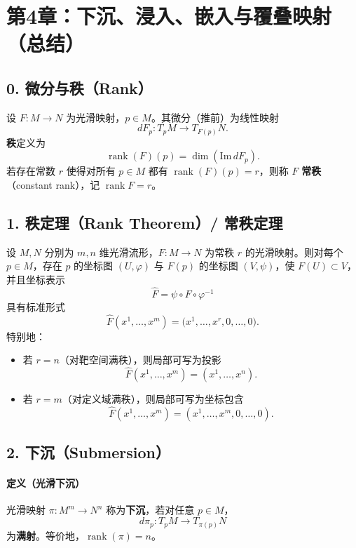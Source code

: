 \documentclass[12pt]{article}
\newcommand{\rank}{\operatorname{rank}}
\begin{document}
\section*{第4章：下沉、浸入、嵌入与覆叠映射（总结）}

\subsection*{0. 微分与秩（Rank）}
设 $F:M\to N$ 为光滑映射，$p\in M$。其微分（推前）为线性映射
\[
dF_p:T_pM\to T_{F(p)}N.
\]
\textbf{秩}定义为
\[
\rank(F)(p)=\dim(\mathrm{Im}\,dF_p).
\]
若存在常数 $r$ 使得对所有 $p\in M$ 都有 $\rank(F)(p)=r$，则称 $F$ \textbf{常秩}（constant rank），记 $\rank F=r$。

\subsection*{1. 秩定理（Rank Theorem）/ 常秩定理}
设 $M,N$ 分别为 $m,n$ 维光滑流形，$F:M\to N$ 为常秩 $r$ 的光滑映射。则对每个 $p\in M$，存在
$p$ 的坐标图 $(U,\varphi)$ 与 $F(p)$ 的坐标图 $(V,\psi)$，使 $F(U)\subset V$，并且坐标表示
\[
\widehat F=\psi\circ F\circ \varphi^{-1}
\]
具有标准形式
\[
\widehat F(x^1,\dots,x^m)=\bigl(x^1,\dots,x^r,0,\dots,0\bigr).
\]
特别地：
\begin{itemize}
\item 若 $r=n$（对靶空间满秩），则局部可写为投影
\[
\widehat F(x^1,\dots,x^m)=(x^1,\dots,x^n).
\]
\item 若 $r=m$（对定义域满秩），则局部可写为坐标包含
\[
\widehat F(x^1,\dots,x^m)=(x^1,\dots,x^m,0,\dots,0).
\]
\end{itemize}

\subsection*{2. 下沉（Submersion）}
\paragraph{定义（光滑下沉）}
光滑映射 $\pi:M^m\to N^n$ 称为\textbf{下沉}，若对任意 $p\in M$，
\[
d\pi_p:T_pM\to T_{\pi(p)}N
\]
为\textbf{满射}。等价地，$\rank(\pi)=n$。
\end{document}
